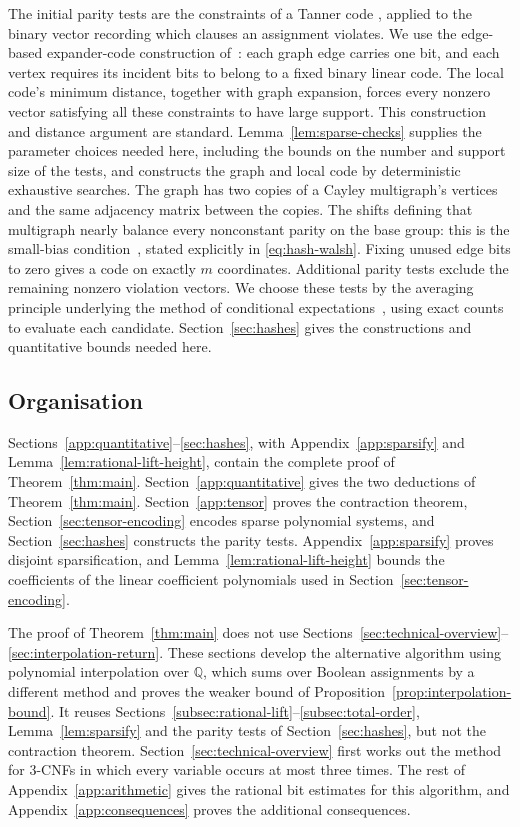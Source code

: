 \documentclass[11pt,reqno]{amsart}
\numberwithin{equation}{section}
\theoremstyle{definition}\newtheorem{definition}[theorem]{Definition}
\theoremstyle{remark}\newtheorem{remark}[theorem]{Remark}
\begin{document}
The initial parity tests are the constraints of a Tanner code
\cite[Section~II]{Tanner81}, applied to the binary vector recording
which clauses an assignment violates. We use the edge-based
expander-code construction of~\cite[Sections~IV and~VI]{SS96}:
each graph edge carries one bit, and each vertex requires its
incident bits to belong to a fixed binary linear code. The local
code's minimum distance, together with graph expansion, forces
every nonzero vector satisfying all these constraints to have
large support. This construction and distance argument are standard.
Lemma~\ref{lem:sparse-checks} supplies the parameter choices needed
here, including the bounds on the number and support size of the
tests, and constructs the graph and local code by deterministic
exhaustive searches. The graph has two copies of a Cayley multigraph's vertices and the same adjacency matrix between the copies.
The shifts defining that multigraph nearly balance every nonconstant
parity on the base group: this is
the small-bias condition~\cite{NN93,AR94}, stated explicitly in
\eqref{eq:hash-walsh}. Fixing unused edge bits to zero gives a code
on exactly $m$ coordinates.
Additional parity tests exclude the remaining nonzero violation
vectors. We choose these tests by the
averaging principle underlying the method of conditional
expectations~\cite{Raghavan88}, using exact counts to evaluate each
candidate. Section~\ref{sec:hashes} gives the constructions and
quantitative bounds needed here.

\subsection{Organisation}
Sections~\ref{app:quantitative}--\ref{sec:hashes}, with
Appendix~\ref{app:sparsify} and Lemma~\ref{lem:rational-lift-height},
contain the complete proof of Theorem~\ref{thm:main}.
Section~\ref{app:quantitative} gives the two deductions of
Theorem~\ref{thm:main}. Section~\ref{app:tensor} proves the contraction
theorem, Section~\ref{sec:tensor-encoding} encodes sparse polynomial
systems, and Section~\ref{sec:hashes} constructs the parity tests.
Appendix~\ref{app:sparsify} proves disjoint sparsification, and
Lemma~\ref{lem:rational-lift-height} bounds the coefficients of the
linear coefficient polynomials used in Section~\ref{sec:tensor-encoding}.

The proof of Theorem~\ref{thm:main} does not use
Sections~\ref{sec:technical-overview}--\ref{sec:interpolation-return}.
These sections develop the alternative algorithm using polynomial interpolation over $\mathbb Q$, which sums over Boolean assignments by a different method
and proves the weaker bound of Proposition~\ref{prop:interpolation-bound}.
It reuses Sections~\ref{subsec:rational-lift}--\ref{subsec:total-order},
Lemma~\ref{lem:sparsify} and the parity tests of
Section~\ref{sec:hashes}, but not the contraction theorem.
Section~\ref{sec:technical-overview} first works out the method for
$3$-CNFs in which every variable occurs at most three times. The rest
of Appendix~\ref{app:arithmetic} gives the rational bit estimates for
this algorithm, and Appendix~\ref{app:consequences} proves the
additional consequences.
\end{document}

